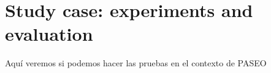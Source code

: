 \section{Study case: experiments and evaluation}
Aquí veremos si podemos hacer las pruebas en el contexto de PASEO

